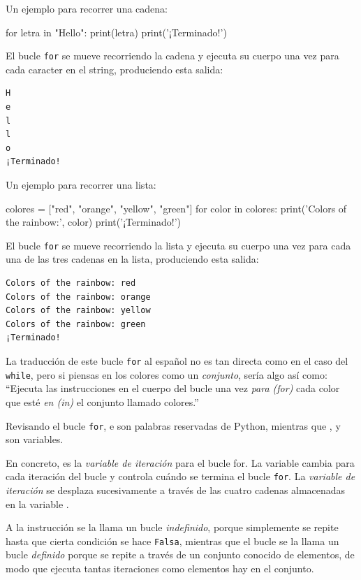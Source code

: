 Un ejemplo para recorrer una cadena:

\begin{python}[frame=single]
for letra in "Hello":
    print(letra)
print('¡Terminado!')
\end{python}

El bucle \texttt{for} se mueve
recorriendo la cadena y ejecuta su cuerpo una vez para cada caracter en el string, produciendo esta salida:


\begin{Verbatim}[frame=single]
H
e
l
l
o
¡Terminado!
\end{Verbatim}

Un ejemplo para recorrer una lista:

\begin{python}[frame=single]
colores = ["red", "orange", "yellow", "green"]
for color in colores:
    print('Colors of the rainbow:', color)
print('¡Terminado!')
\end{python}

El bucle \texttt{for} se mueve
recorriendo la lista y ejecuta su cuerpo una vez para cada una de las
tres cadenas en la lista, produciendo esta salida:

\begin{Verbatim}[frame=single]
Colors of the rainbow: red
Colors of the rainbow: orange
Colors of the rainbow: yellow
Colors of the rainbow: green
¡Terminado!
\end{Verbatim}

La traducción de este bucle \texttt{for} al español no es tan directa
como en el caso del \texttt{while}, pero si piensas en los colores como
un \emph{conjunto}, sería algo así como: ``Ejecuta las instrucciones en el
cuerpo del bucle una vez \emph{para (for)} cada color que esté \emph{en
(in)} el conjunto llamado colores.''

Revisando el bucle \texttt{for},  e  son palabras
reservadas de Python, mientras que ,  y  son
variables.

En concreto,  es la \emph{variable de iteración} para el
bucle for. La variable  cambia para cada iteración del
bucle y controla cuándo se termina el bucle \texttt{for}. La
\emph{variable de iteración} se desplaza sucesivamente a través de las
cuatro cadenas almacenadas en la variable .


A la instrucción  se la llama un bucle \emph{indefinido},
porque simplemente se repite hasta que cierta condición se hace
\texttt{Falsa}, mientras que el bucle  se la llama un bucle \emph{definido} porque se repite a través de
un conjunto conocido de elementos, de modo que ejecuta tantas
iteraciones como elementos hay en el conjunto.



